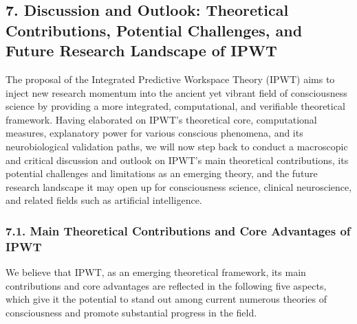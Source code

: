 \documentclass[
  a4paper]{article}
\begin{document}
\subsection{7. Discussion and Outlook: Theoretical Contributions,
Potential Challenges, and Future Research Landscape of
IPWT}\label{discussion-and-outlook-theoretical-contributions-potential-challenges-and-future-research-landscape-of-ipwt}

The proposal of the Integrated Predictive Workspace Theory (IPWT) aims
to inject new research momentum into the ancient yet vibrant field of
consciousness science by providing a more integrated, computational, and
verifiable theoretical framework. Having elaborated on IPWT's
theoretical core, computational measures, explanatory power for various
conscious phenomena, and its neurobiological validation paths, we will
now step back to conduct a macroscopic and critical discussion and
outlook on IPWT's main theoretical contributions, its potential
challenges and limitations as an emerging theory, and the future
research landscape it may open up for consciousness science, clinical
neuroscience, and related fields such as artificial intelligence.

\subsubsection{7.1. Main Theoretical Contributions and Core Advantages
of
IPWT}\label{main-theoretical-contributions-and-core-advantages-of-ipwt}

We believe that IPWT, as an emerging theoretical framework, its main
contributions and core advantages are reflected in the following five
aspects, which give it the potential to stand out among current numerous
theories of consciousness and promote substantial progress in the field.
\end{document}

